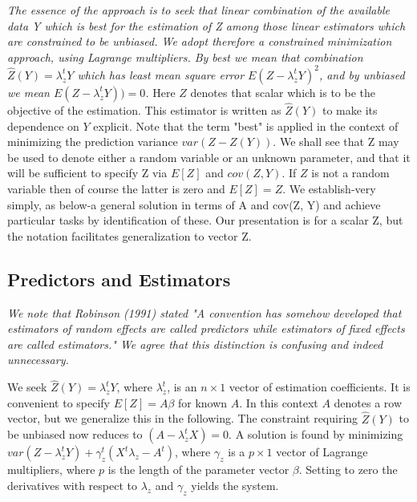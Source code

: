 \documentclass[12pt, a4paper]{article}
\begin{document}
\emph{
	The essence of the approach is to seek that linear combination of the available data Y which is best for the
	estimation of Z among those linear estimators which are constrained to be unbiased. We adopt therefore a constrained minimization approach, using Lagrange multipliers. By best we mean that combination $\hat{Z}(Y) = \lambda_{z}^{t}Y$ which has least mean square error $E( Z- \lambda_{z}^{t}Y)^2$, and by unbiased we mean $E( Z- \lambda_{z}^{t}Y)) = 0$. }
Here $Z$ denotes that scalar which is to be the objective of the estimation. This estimator is written as $\hat{Z}(Y)$ to make its dependence on $Y$ explicit. Note that the term "best" is applied in the context of minimizing the prediction variance $var(Z - Z(Y))$. We shall see that Z may be used to denote either a random variable or an unknown parameter, and that it will be sufficient to specify Z via $E[Z]$ and $cov(Z, Y)$. If $Z$ is not a random variable then of course the latter is zero and $E[Z] = Z$. We establish-very simply, as below-a general solution in terms of A and cov(Z, Y) and achieve particular tasks by identification of these. Our presentation is for a scalar Z, but the notation facilitates generalization to vector Z.



\subsection{Predictors and Estimators}

\emph{We note that Robinson (1991) stated "A convention has somehow developed that estimators of random effects are called predictors while estimators of fixed effects are called estimators." We agree that this distinction is confusing and indeed unnecessary.} \\ \bigskip



We seek $\hat{Z}(Y) = \lambda_{z}^{t}Y$, where $ \lambda_{z}^{t}$, is an $n \times 1$ vector of estimation coefficients. It is convenient to specify $E[Z]=A\beta$ for known $A$. In this context $A$ denotes a row vector, but we generalize this in the following. The constraint requiring $\hat{Z}(Y)$ to be unbiased now reduces to $(A -  \lambda_{z}^{t}X) = 0$. A solution is found by minimizing $var(Z -  \lambda_{z}^{t}Y) + \gamma^t_z (X^t\lambda_{z} - A^t)$, where $\gamma_z$ is a $p \times 1$ vector of Lagrange multipliers, where $p$ is the length of the parameter vector $\beta$. Setting to zero the derivatives with respect to $\lambda_{z}$ and $\gamma_z $ yields the system.
\end{document}
